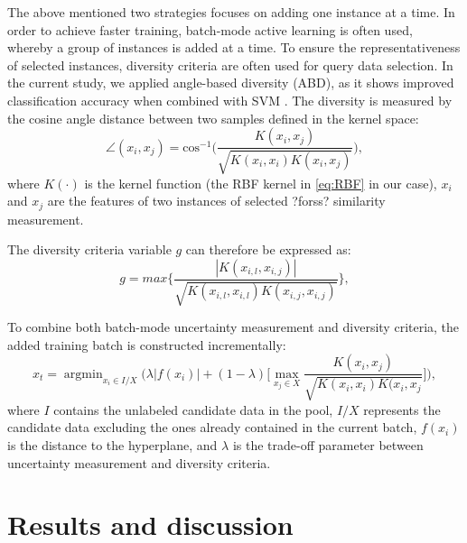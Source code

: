 The above mentioned two strategies focuses on adding one instance at a time. In order to achieve faster training, batch-mode active learning is often used, whereby a group of instances is added at a time. To ensure the representativeness of selected instances,  diversity criteria are often used for query data selection. In the current study, we applied angle-based diversity (ABD), as it shows improved classification accuracy when combined with SVM \cite{brinker2003incorporating, demir2011batch}. 
The diversity is measured by the cosine angle distance between two samples defined in the kernel space:
\begin{equation}
\angle (x_{i},  x_j) = \text{cos}^{-1} \big(   \frac{K(x_i, x_j)}   {\sqrt{K(x_i, x_i) K(x_i, x_j)}  } \big),
\label{eq:ABD_angle}
\end{equation}
where $K(\cdot)$ is the kernel function (the RBF kernel in \eqref{eq:RBF} in our case), $x_i$  and $x_j$ are the features of two instances of selected ?forss? similarity measurement.

The diversity criteria variable $g$ can therefore be expressed as:
\begin{equation}
g = max \{ \frac{|K(x_{i,l}, x_{i,j})|}{\sqrt{ K(x_{i,l}, x_{i,l}) K(x_{i,j}, x_{i,j})   }} \},
\label{eq:ABD_criteria}
\end{equation}


To combine both batch-mode uncertainty measurement and diversity criteria, the added training batch is constructed incrementally: 
\begin{equation}
\label{eq:combined_AL}  
    x_t = \mathop{\arg\min}_{x_{i}\in I/X}  \Big( \lambda |f(x_i)| + (1 - \lambda) \big[ \max_{x_{j} \in X}  \frac{K(x_i, x_j)}   {\sqrt{K(x_i, x_i) K(x_i, x_j}  }\big] \Big),
\end{equation} 
 where $I$ contains the unlabeled candidate data in the pool, $I/X$ represents the candidate data excluding the ones already contained in the current batch, $f(x_i)$ is the distance to the hyperplane, and $\lambda$ is the trade-off parameter between uncertainty measurement and diversity criteria. 
 

\section{Results and discussion}
\label{chap2:sec:results_and_discussion}

